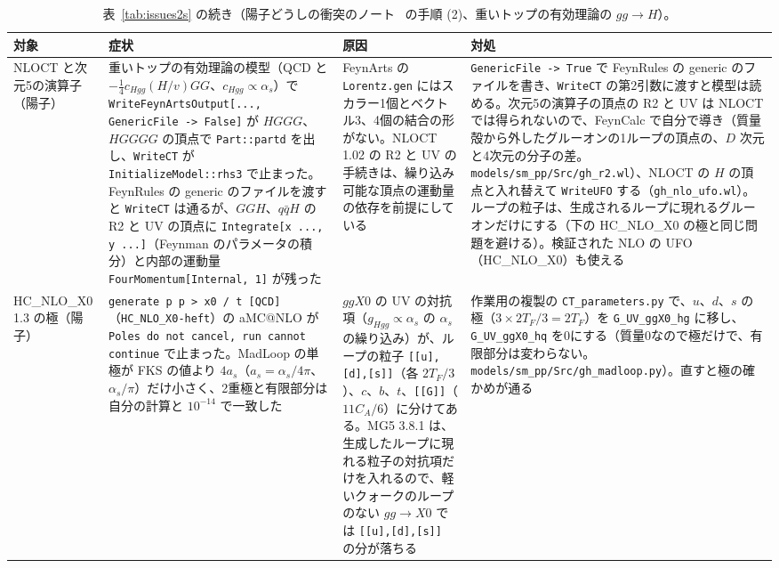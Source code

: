 \documentclass[a4paper,10pt]{ltjsarticle}
\begin{document}
\begin{table}[tbp]
\centering\footnotesize
\caption{表~\ref{tab:issues2s} の続き（陽子どうしの衝突のノート~\cite{ppnote} の手順 (2)、重いトップの有効理論の $gg\to H$）。}
\label{tab:issues2t}
\begin{tabularx}{\linewidth}{>{\raggedright\arraybackslash}p{2.4cm}>{\raggedright\arraybackslash}X>{\raggedright\arraybackslash}X>{\raggedright\arraybackslash}X}
\toprule
\textbf{対象} & \textbf{症状} & \textbf{原因} & \textbf{対処} \\
\midrule
NLOCT と次元5の演算子（陽子） & 重いトップの有効理論の模型（QCD と $-\frac14c_{Hgg}(H/v)GG$、$c_{Hgg}\propto\alpha_s$）で \texttt{WriteFeynArtsOutput[..., GenericFile -> False]} が $HGGG$、$HGGGG$ の頂点で \texttt{Part::partd} を出し、\texttt{WriteCT} が \texttt{InitializeModel::rhs3} で止まった。FeynRules の generic のファイルを渡すと \texttt{WriteCT} は通るが、$GGH$、$q\bar qH$ の R2 と UV の頂点に \texttt{Integrate[x ..., y ...]}（Feynman のパラメータの積分）と内部の運動量 \texttt{FourMomentum[Internal, 1]} が残った & FeynArts の \texttt{Lorentz.gen} にはスカラー1個とベクトル3、4個の結合の形がない。NLOCT 1.02 の R2 と UV の手続きは、繰り込み可能な頂点の運動量の依存を前提にしている & \texttt{GenericFile -> True} で FeynRules の generic のファイルを書き、\texttt{WriteCT} の第2引数に渡すと模型は読める。次元5の演算子の頂点の R2 と UV は NLOCT では得られないので、FeynCalc で自分で導き（質量殻から外したグルーオンの1ループの頂点の、$D$ 次元と4次元の分子の差。\nolinkurl{models/sm_pp/Src/gh_r2.wl}）、NLOCT の $H$ の頂点と入れ替えて \texttt{WriteUFO} する（\nolinkurl{gh_nlo_ufo.wl}）。ループの粒子は、生成されるループに現れるグルーオンだけにする（下の HC\_NLO\_X0 の極と同じ問題を避ける）。検証された NLO の UFO（HC\_NLO\_X0）も使える \\
HC\_NLO\_X0 1.3 の極（陽子） & \texttt{generate p p > x0 / t [QCD]}（\texttt{HC\_NLO\_X0-heft}）の aMC@NLO が \texttt{Poles do not cancel, run cannot continue} で止まった。MadLoop の単極が FKS の値より $4a_s$（$a_s=\alpha_s/4\pi$、$\alpha_s/\pi$）だけ小さく、2重極と有限部分は自分の計算と $10^{-14}$ で一致した & $ggX0$ の UV の対抗項（$g_{Hgg}\propto\alpha_s$ の $\alpha_s$ の繰り込み）が、ループの粒子 \texttt{[[u],[d],[s]]}（各 $2T_F/3$）、$c$、$b$、$t$、\texttt{[[G]]}（$11C_A/6$）に分けてある。MG5 3.8.1 は、生成したループに現れる粒子の対抗項だけを入れるので、軽いクォークのループのない $gg\to X0$ では \texttt{[[u],[d],[s]]} の分が落ちる & 作業用の複製の \texttt{CT\_parameters.py} で、$u$、$d$、$s$ の極（$3\times2T_F/3=2T_F$）を \texttt{G\_UV\_ggX0\_hg} に移し、\texttt{G\_UV\_ggX0\_hq} を0にする（質量0なので極だけで、有限部分は変わらない。\nolinkurl{models/sm_pp/Src/gh_madloop.py}）。直すと極の確かめが通る \\

\end{tabularx}
\end{table}
\end{document}
